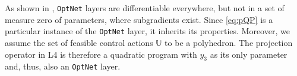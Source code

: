 \begin{remark}
	As shown in \cite[Theorem~1]{amos2017optnet}, \texttt{OptNet} layers are differentiable everywhere, but not in a set of measure zero of parameters, where subgradients exist. Since \eqref{eq:pQP} is a particular instance of the \texttt{OptNet} layer, it inherits its properties. Moreover, we assume the set of feasible control actions $\mathbb{U}$ to be a polyhedron. The projection operator in L4 is therefore a quadratic program with $y_3$ as its only parameter and, thus, also an \texttt{OptNet} layer.
\end{remark}

%


